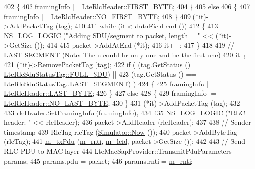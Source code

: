 \begin{DoxyCode}
402     \{
403       framingInfo |= \hyperlink{classns3_1_1LteRlcHeader_a9bfac53b015df1fd1fe649764534b0deaa3a14c19603556ac2ead7440fd6d54ba}{LteRlcHeader::FIRST\_BYTE};
404     \}
405   \textcolor{keywordflow}{else}
406     \{
407       framingInfo |= \hyperlink{classns3_1_1LteRlcHeader_a9bfac53b015df1fd1fe649764534b0dea610c4bd2a31d4896f4bb1d08cb96dfbb}{LteRlcHeader::NO\_FIRST\_BYTE};
408     \}
409   (*it)->AddPacketTag (tag);
410 
411   \textcolor{keywordflow}{while} (it < dataField.end ())
412     \{
413       \hyperlink{group__logging_ga88acd260151caf2db9c0fc84997f45ce}{NS\_LOG\_LOGIC} (\textcolor{stringliteral}{"Adding SDU/segment to packet, length = "} << (*it)->GetSize ());
414 
415       packet->AddAtEnd (*it);
416       it++;
417     \}
418 
419   \textcolor{comment}{// LAST SEGMENT (Note: There could be only one and be the first one)}
420   it--;
421   (*it)->RemovePacketTag (tag);
422   \textcolor{keywordflow}{if} ( (tag.GetStatus () == \hyperlink{classns3_1_1LteRlcSduStatusTag_ae7822c5cc0d54a3d193b09a91ed6f133ade41b0025c66cd211e992196f314d4a5}{LteRlcSduStatusTag::FULL\_SDU}) ||
423         (tag.GetStatus () == \hyperlink{classns3_1_1LteRlcSduStatusTag_ae7822c5cc0d54a3d193b09a91ed6f133a4e59540a0a5c4530b61e4feda355be7b}{LteRlcSduStatusTag::LAST\_SEGMENT}) )
424     \{
425       framingInfo |= \hyperlink{classns3_1_1LteRlcHeader_abf2c6056d7e9ebe1872e2243e5fc65aaa0cb019a1055c009eb8c8ff34f796cb89}{LteRlcHeader::LAST\_BYTE};
426     \}
427   \textcolor{keywordflow}{else}
428     \{
429       framingInfo |= \hyperlink{classns3_1_1LteRlcHeader_abf2c6056d7e9ebe1872e2243e5fc65aaac36f5c572c5ab51ef1652c5d4e4c9e7d}{LteRlcHeader::NO\_LAST\_BYTE};
430     \}
431   (*it)->AddPacketTag (tag);
432 
433   rlcHeader.SetFramingInfo (framingInfo);
434 
435   \hyperlink{group__logging_ga88acd260151caf2db9c0fc84997f45ce}{NS\_LOG\_LOGIC} (\textcolor{stringliteral}{"RLC header: "} << rlcHeader);
436   packet->AddHeader (rlcHeader);
437 
438   \textcolor{comment}{// Sender timestamp}
439   RlcTag rlcTag (\hyperlink{classns3_1_1Simulator_ac3178fa975b419f7875e7105be122800}{Simulator::Now} ());
440   packet->AddByteTag (rlcTag);
441   \hyperlink{classns3_1_1LteRlc_aa14f9d8b8828d0b0859f1870ae1248e6}{m\_txPdu} (\hyperlink{classns3_1_1LteRlc_a48ab0a78e7f2687337075b1c8832df70}{m\_rnti}, \hyperlink{classns3_1_1LteRlc_a051085e9b27883e7ba4b98ad7242fd8a}{m\_lcid}, packet->GetSize ());
442 
443   \textcolor{comment}{// Send RLC PDU to MAC layer}
444   LteMacSapProvider::TransmitPduParameters params;
445   params.pdu = packet;
446   params.rnti = \hyperlink{classns3_1_1LteRlc_a48ab0a78e7f2687337075b1c8832df70}{m\_rnti};

\end{DoxyCode}

